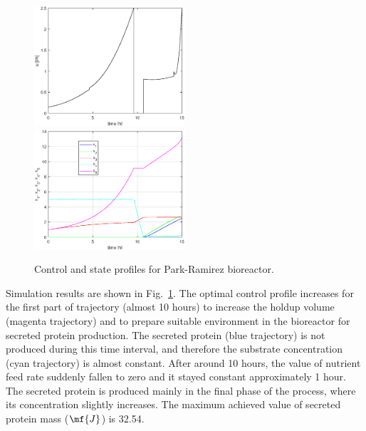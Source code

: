 \begin{figure}[htb]
	\includegraphics[width=0.5\textwidth]{examples/problem_pr_bior/graphs/u.eps}
	\includegraphics[width=0.5\textwidth]{examples/problem_pr_bior/graphs/x.eps}
	\caption{Control and state profiles for Park-Ramirez bioreactor.} \label{fig:prob_pr_bior}
\end{figure}

Simulation results are shown in Fig.~\ref{fig:prob_pr_bior}. The optimal control profile increases for the first part of trajectory (almost 10 hours) to increase the holdup volume (magenta trajectory) and to prepare suitable environment in the bioreactor for secreted protein production. The secreted protein (blue trajectory) is not produced during this time interval, and therefore the substrate concentration (cyan trajectory) is almost constant. After around 10 hours, the value of nutrient feed rate suddenly fallen to zero and it stayed constant approximately 1 hour. The secreted protein is produced mainly in the final phase of the process, where its concentration slightly increases. The maximum achieved value of secreted protein mass ($\mf{J}$) is 32.54.

